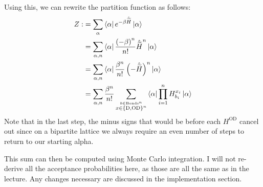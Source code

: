 \documentclass[ngerman]{scrartcl}
\begin{document}
Using this, we can rewrite the partition function as follows:
\begin{align*}
    Z:&=\sum_\alpha \bra{\alpha}e^{-\beta\hat{\widetilde{H}}}\ket{\alpha}\\
    &=\sum_{\alpha,n}\bra{\alpha}\frac{\left(-\beta\right)^n}{n!}\hat{\widetilde{H}}^n\ket{\alpha}\\
    &=\sum_{\alpha,n}\bra{\alpha}\frac{\beta^n}{n!}\left(-\hat{\widetilde{H}}\right)^n\ket{\alpha}\\
    &=\sum_{\alpha,n}\frac{\beta^n}{n!}\sum_{\overset{b\in \text{Bonds}^n}{x \in \left\{\text{D},\text{OD}\right\}^n}} \bra{\alpha} \prod_{i=1}^{n} H_{b_i}^{x_i} \ket{\alpha}
\end{align*}
Note that in the last step, the minus signs that would be before each $H^\text{OD}$ cancel out since on a bipartite lattice we always require an even number of steps to return to our starting alpha.

This sum can then be computed using Monte Carlo integration. I will not re-derive all the acceptance probabilities here, as those are all the same as in the lecture. Any changes necessary are discussed in the implementation section.
\end{document}
